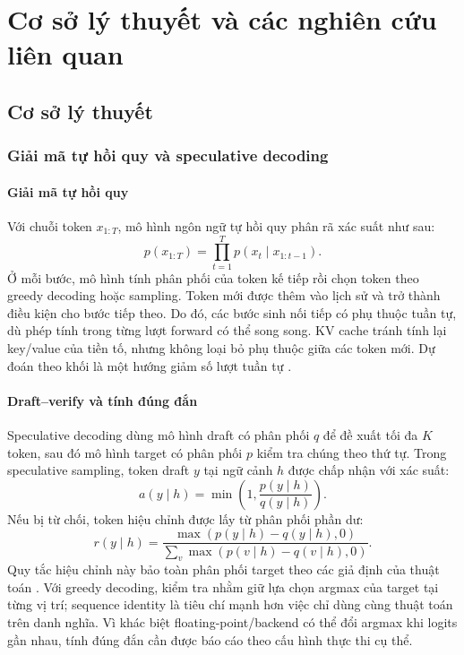 \chapter{Cơ sở lý thuyết và các nghiên cứu liên quan}

\section{Cơ sở lý thuyết}
\subsection{Giải mã tự hồi quy và speculative decoding}
\subsubsection{Giải mã tự hồi quy}
Với chuỗi token $x_{1:T}$, mô hình ngôn ngữ tự hồi quy phân rã xác suất như sau:
\begin{equation}
    p(x_{1:T})=\prod_{t=1}^{T}p(x_t\mid x_{1:t-1}).
\end{equation}
Ở mỗi bước, mô hình tính phân phối của token kế tiếp rồi chọn token theo greedy decoding hoặc sampling. Token mới được thêm vào lịch sử và trở thành điều kiện cho bước tiếp theo. Do đó, các bước sinh nối tiếp có phụ thuộc tuần tự, dù phép tính trong từng lượt forward có thể song song. KV cache tránh tính lại key/value của tiền tố, nhưng không loại bỏ phụ thuộc giữa các token mới. Dự đoán theo khối là một hướng giảm số lượt tuần tự \cite{stern2018blockwise}.

\subsubsection{Draft--verify và tính đúng đắn}
Speculative decoding dùng mô hình draft có phân phối $q$ để đề xuất tối đa $K$ token, sau đó mô hình target có phân phối $p$ kiểm tra chúng theo thứ tự. Trong speculative sampling, token draft $y$ tại ngữ cảnh $h$ được chấp nhận với xác suất:
\begin{equation}
    a(y\mid h)=\min\left(1,\frac{p(y\mid h)}{q(y\mid h)}\right).
\end{equation}
Nếu bị từ chối, token hiệu chỉnh được lấy từ phân phối phần dư:
\begin{equation}
    r(y\mid h)=\frac{\max(p(y\mid h)-q(y\mid h),0)}
    {\sum_v\max(p(v\mid h)-q(v\mid h),0)}.
\end{equation}
Quy tắc hiệu chỉnh này bảo toàn phân phối target theo các giả định của thuật toán \cite{leviathan2023fast,chen2023accelerating}. Với greedy decoding, kiểm tra nhằm giữ lựa chọn argmax của target tại từng vị trí; sequence identity là tiêu chí mạnh hơn việc chỉ dùng cùng thuật toán trên danh nghĩa. Vì khác biệt floating-point/backend có thể đổi argmax khi logits gần nhau, tính đúng đắn cần được báo cáo theo cấu hình thực thi cụ thể.

